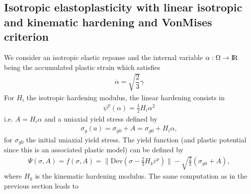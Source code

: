 \documentclass[a4paper,11pt,english]{sphinxmanual}
\begin{document}
\subsection{Isotropic elastoplasticity with linear isotropic and kinematic hardening and Von\sphinxhyphen{}Mises criterion}
\label{\detokenize{userdoc/model_plasticity_small_strain:isotropic-elastoplasticity-with-linear-isotropic-and-kinematic-hardening-and-von-mises-criterion}}
We consider an isotropic elastic reponse and the internal variable \(\alpha : \Omega \rightarrow \rm I\hspace{-0.15em}R\) being the accumulated plastic strain which satisfies
\begin{equation*}
\begin{split}\dot{\alpha} = \sqrt{\dfrac{2}{3}}\gamma\end{split}
\end{equation*}
For \(H_i\) the isotropic hardening modulus, the linear hardening consists in
\begin{equation*}
\begin{split}\psi^p(\alpha) = \frac{1}{2}H_i\alpha^2\end{split}
\end{equation*}
i.e. \(A = H_i\alpha\) and a uniaxial yield stress defined by
\begin{equation*}
\begin{split}\sigma_y(a) = \sigma_{y0} + A = \sigma_{y0} + H_i\alpha,\end{split}
\end{equation*}
for \(\sigma_{y0}\) the initial uniaxial yield stress. The yield function (and plastic potential since this is an associated plastic model) can be defined by
\begin{equation*}
\begin{split}\Psi(\sigma, A) = f(\sigma, A) = \|\mbox{Dev}(\sigma - \frac{2}{3}H_k\varepsilon^p)\| - \sqrt{\frac{2}{3}}(\sigma_{y0} + A),\end{split}
\end{equation*}
where \(H_k\) is the kinematic hardening modulus. The same computation as in the previous section leads to
\end{document}

